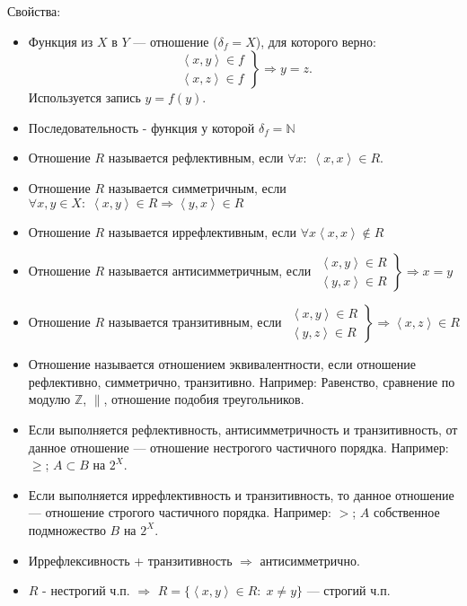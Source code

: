 \documentclass[12pt]{article}
\begin{document}
Свойства:
\begin{itemize}
    \item Функция из $X$ в  $Y$ --- отношение ($\delta_f = X$), для которого верно:
    \[
    \left. \begin{array}{l} \left<x,y\right> \in f \\ \left<x, z\right> \in f \end{array} \right\} \Rightarrow y = z
    .\]
    Используется запись $y = f(y)$. 
    \item Последовательность - функция у которой $\delta_f = \mathbb{N}$
    \item Отношение $R$ называется рефлективным, если $\forall x: \; \left<x, x\right> \in R$.
    \item Отношение $R$ называется симметричным, если  $\forall x, y \in X: \; \left<x, y\right> \in R \Rightarrow \left<y, x\right> \in R$
    \item Отношение $R$ называется иррефлективным, если  $\forall x \left<x,x\right> \notin R$
    \item Отношение $R$ называется антисимметричным, если  $\left. \begin{array}{r} \left<x, y\right> \in R \\ \left<y, x\right> \in R\end{array} \right\} \Rightarrow x = y$
    \item Отношение $R$ называется транзитивным, если  $\left. \begin{array}{r} \left<x, y\right> \in R \\ \left<y, z\right> \in R\end{array} \right\} \Rightarrow \left<x, z\right> \in R$\\
    \item Отношение называется отношением эквивалентности, если отношение рефлективно, симметрично, транзитивно. Например: Равенство, сравнение по модулю $\mathbb{Z}$,  $\|$, отношение подобия треугольников.
    \item Если выполняется рефлективность, антисимметричность и транзитивность, от данное отношение --- отношение нестрогого частичного порядка. Например: $\ge$; $A \subset B$ на $2^X$.
    \item Если выполняется иррефлективность и транзитивность, то данное отношение --- отношение строгого частичного порядка. Например: $>$;  $A$ собственное подмножество  $B$ на  $2^X$.
    \item Иррефлексивность + транзитивность $\Rightarrow$ антисимметрично.
    \item $R$ - нестрогий ч.п.  $\Rightarrow$ $R = \{\left<x,y\right> \in R: \; x \neq y\}$ --- строгий ч.п.
\end{itemize}
\end{document}
